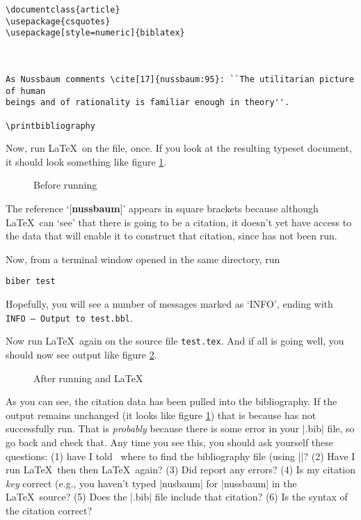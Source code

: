 \begin{verbatim}
\documentclass{article}
\usepackage{csquotes}
\usepackage[style=numeric]{biblatex}



As Nussbaum comments \cite[17]{nussbaum:95}: ``The utilitarian picture of human
beings and of rationality is familiar enough in theory''.

\printbibliography

\end{verbatim}

Now, run \LaTeX\ on the file, once. If you look at the resulting typeset document, it should look something like figure \ref{nussbaum1}.

\begin{figure}
\caption{Before running }\label{nussbaum1}
\end{figure}

The reference `[\textbf{nussbaum}]' appears in square brackets because although \LaTeX\ can `see' that there is going to be a citation, it doesn't yet have access to the data that will enable it to construct that citation, since  has not been run.

Now, from a terminal window opened in the same directory, run
\begin{verbatim}
biber test
\end{verbatim}

Hopefully, you will see a number of messages marked as `INFO', ending with \texttt{INFO -- Output to test.bbl}.

Now run \LaTeX\ again on the source file \verb|test.tex|. And if all is going well, you should now see output like figure \ref{nussbaum2}.

\begin{figure}
\caption{After running  and \LaTeX}\label{nussbaum2}
\end{figure}

As you can see, the citation data has been pulled into the bibliography. If the output remains unchanged (it looks like figure \ref{nussbaum1}) that is because  has not successfully run. That is \emph{probably} because there is some error in your |.bib| file, so go back and check that. Any time you see this, you should ask yourself these questions: (1) have I told \biblatex\ where to find the bibliography file (using ||? (2) Have I run \LaTeX\ then  then \LaTeX\ again? (3) Did  report any errors? (4) Is my citation \emph{key} correct (e.g., you haven't typed |nusbaum| for |nussbaum| in the \LaTeX\ source? (5) Does the |.bib| file include that citation? (6) Is the syntax of the citation correct?
